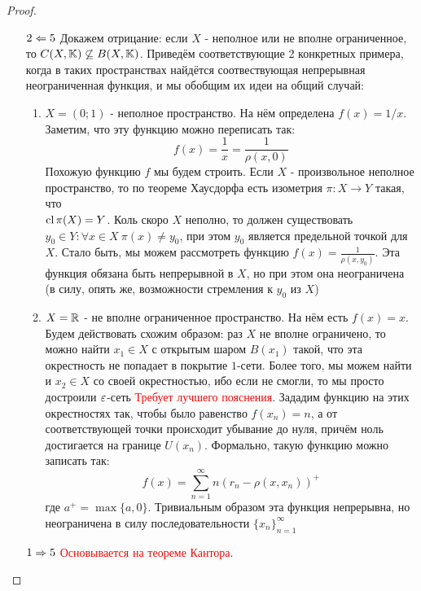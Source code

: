 \begin{proof}
\begin{enumerate}
		\item[$2 \Leftarrow 5$] Докажем отрицание: если $X$ - неполное или не вполне ограниченное, то $C(X, \K) \centernot\subseteq B(X, \K)$. Приведём соответствующие 2 конкретных примера, когда в таких пространствах найдётся соотвествующая непрерывная неограниченная функция, и мы обобщим их идеи на общий случай:
		\begin{enumerate}
			\item $X = (0; 1)$ - неполное пространство. На нём определена $f(x) = 1 / x$. Заметим, что эту функцию можно переписать так:
			\[
				f(x) = \frac{1}{x} = \frac{1}{\rho(x, 0)}
			\]
			Похожую функцию $f$ мы будем строить. Если $X$ - произвольное неполное пространство, то по теореме Хаусдорфа есть изометрия $\pi \colon X \to Y$ такая, что \\ $\operatorname{cl} \pi(X) = Y$. Коль скоро $X$ неполно, то должен существовать $y_0 \in Y \colon \forall x \in X\ \pi(x) \neq y_0$, при этом $y_0$ является предельной точкой для $X$. Стало быть, мы можем рассмотреть функцию $f(x) = \frac{1}{\rho(x, y_0)}$. Эта функция обязана быть непрерывной в $X$, но при этом она неограничена (в силу, опять же, возможности стремления к $y_0$ из $X$)
			
			\item $X = \mathbb{R}$ - не вполне ограниченное пространство. На нём есть $f(x) = x$. Будем действовать схожим образом: раз $X$ не вполне ограничено, то можно найти $x_1 \in X$ с открытым шаром $B(x_1)$ такой, что эта окрестность не попадает в покрытие $1$-сети. Более того, мы можем найти и $x_2 \in X$ со своей окрестностью, ибо если не смогли, то мы просто достроили $\varepsilon$-сеть \textcolor{red}{Требует лучшего пояснения}. Зададим функцию на этих окрестностях так, чтобы было равенство $f(x_n) = n$, а от соответствующей точки происходит убывание до нуля, причём ноль достигается на границе $U(x_n)$. Формально, такую функцию можно записать так:
			\[
				f(x) = \sum_{n = 1}^\infty n(r_n - \rho(x, x_n))^+
			\]
			где $a^+ = \max\{a, 0\}$. Тривиальным образом эта функция непрерывна, но неограничена в силу последовательности $\{x_n\}_{n = 1}^\infty$
		\end{enumerate}
	
		\item[$1 \Rightarrow 5$] \textcolor{red}{Основывается на теореме Кантора}.
	\end{enumerate}
\end{proof}
